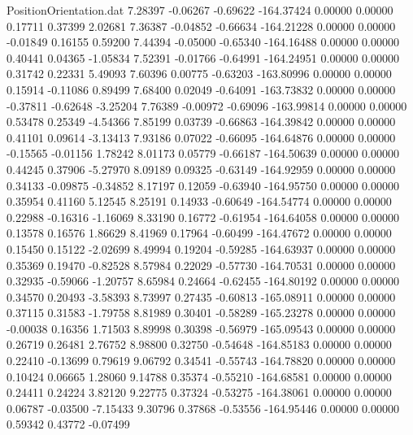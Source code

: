 \begin{filecontents}{PositionOrientation.dat}
   7.28397   -0.06267   -0.69622  -164.37424    0.00000    0.00000    0.17711    0.37399    2.02681
   7.36387   -0.04852   -0.66634  -164.21228    0.00000    0.00000   -0.01849    0.16155    0.59200
   7.44394   -0.05000   -0.65340  -164.16488    0.00000    0.00000    0.40441    0.04365   -1.05834
   7.52391   -0.01766   -0.64991  -164.24951    0.00000    0.00000    0.31742    0.22331    5.49093
   7.60396    0.00775   -0.63203  -163.80996    0.00000    0.00000    0.15914   -0.11086    0.89499
   7.68400    0.02049   -0.64091  -163.73832    0.00000    0.00000   -0.37811   -0.62648   -3.25204
   7.76389   -0.00972   -0.69096  -163.99814    0.00000    0.00000    0.53478    0.25349   -4.54366
   7.85199    0.03739   -0.66863  -164.39842    0.00000    0.00000    0.41101    0.09614   -3.13413
   7.93186    0.07022   -0.66095  -164.64876    0.00000    0.00000   -0.15565   -0.01156    1.78242
   8.01173    0.05779   -0.66187  -164.50639    0.00000    0.00000    0.44245    0.37906   -5.27970
   8.09189    0.09325   -0.63149  -164.92959    0.00000    0.00000    0.34133   -0.09875   -0.34852
   8.17197    0.12059   -0.63940  -164.95750    0.00000    0.00000    0.35954    0.41160    5.12545
   8.25191    0.14933   -0.60649  -164.54774    0.00000    0.00000    0.22988   -0.16316   -1.16069
   8.33190    0.16772   -0.61954  -164.64058    0.00000    0.00000    0.13578    0.16576    1.86629
   8.41969    0.17964   -0.60499  -164.47672    0.00000    0.00000    0.15450    0.15122   -2.02699
   8.49994    0.19204   -0.59285  -164.63937    0.00000    0.00000    0.35369    0.19470   -0.82528
   8.57984    0.22029   -0.57730  -164.70531    0.00000    0.00000    0.32935   -0.59066   -1.20757
   8.65984    0.24664   -0.62455  -164.80192    0.00000    0.00000    0.34570    0.20493   -3.58393
   8.73997    0.27435   -0.60813  -165.08911    0.00000    0.00000    0.37115    0.31583   -1.79758
   8.81989    0.30401   -0.58289  -165.23278    0.00000    0.00000   -0.00038    0.16356    1.71503
   8.89998    0.30398   -0.56979  -165.09543    0.00000    0.00000    0.26719    0.26481    2.76752
   8.98800    0.32750   -0.54648  -164.85183    0.00000    0.00000    0.22410   -0.13699    0.79619
   9.06792    0.34541   -0.55743  -164.78820    0.00000    0.00000    0.10424    0.06665    1.28060
   9.14788    0.35374   -0.55210  -164.68581    0.00000    0.00000    0.24411    0.24224    3.82120
   9.22775    0.37324   -0.53275  -164.38061    0.00000    0.00000    0.06787   -0.03500   -7.15433
   9.30796    0.37868   -0.53556  -164.95446    0.00000    0.00000    0.59342    0.43772   -0.07499

\end{filecontents}
